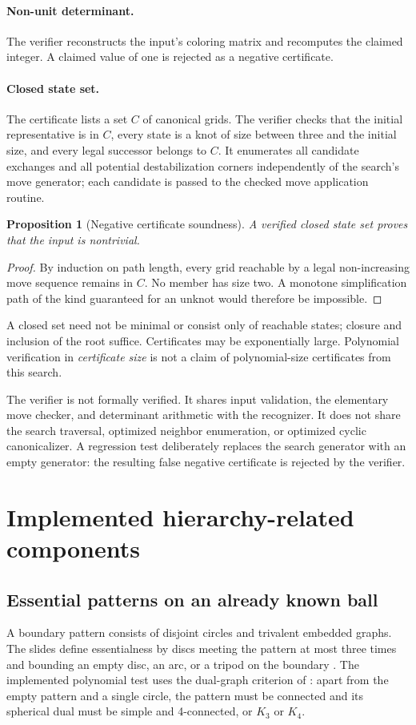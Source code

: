 \documentclass[11pt]{article}
\newtheorem{proposition}[theorem]{Proposition}
\begin{document}
\paragraph{Non-unit determinant.}
The verifier reconstructs the input's coloring matrix and recomputes the claimed
integer. A claimed value of one is rejected as a negative certificate.

\paragraph{Closed state set.}
The certificate lists a set $C$ of canonical grids. The verifier checks that
the initial representative is in $C$, every state is a knot of size between
three and the initial size, and every legal successor belongs to $C$.
It enumerates all candidate exchanges and all potential destabilization
corners independently of the search's move generator; each candidate is passed
to the checked move application routine.

\begin{proposition}[Negative certificate soundness]
A verified closed state set proves that the input is nontrivial.
\end{proposition}
\begin{proof}
By induction on path length, every grid reachable by a legal non-increasing
move sequence remains in $C$. No member has size two. A monotone simplification
path of the kind guaranteed for an unknot would therefore be impossible.
\end{proof}

A closed set need not be minimal or consist only of reachable states; closure
and inclusion of the root suffice. Certificates may be exponentially large.
Polynomial verification in \emph{certificate size} is not a claim of
polynomial-size certificates from this search.

The verifier is not formally verified. It shares input validation, the elementary
move checker, and determinant arithmetic with the recognizer. It does not share
the search traversal, optimized neighbor enumeration, or optimized cyclic
canonicalizer. A regression test deliberately replaces the search generator
with an empty generator: the resulting false negative certificate is rejected
by the verifier.

\section{Implemented hierarchy-related components}
\subsection{Essential patterns on an already known ball}
A boundary pattern consists of disjoint circles and trivalent embedded graphs.
The slides define essentialness by discs meeting the pattern at most three
times and bounding an empty disc, an arc, or a tripod on the boundary
\cite[pp.~24--26]{slides}. The implemented polynomial test uses the dual-graph
criterion of \cite[Proposition~2.6]{lackenby}: apart from the empty pattern and
a single circle, the pattern must be connected and its spherical dual must be
simple and 4-connected, or $K_3$ or $K_4$.
\end{document}
